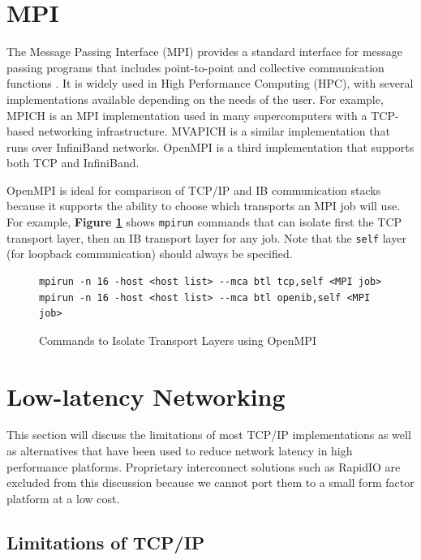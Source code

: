 \documentclass[11pt]{book}
\begin{document}
\section{\textbf{MPI}}

The Message Passing Interface (MPI) provides a standard interface for message
passing programs that includes point-to-point and collective communication
functions \cite{mpi-12}. It is widely used in High Performance Computing (HPC), with several
implementations available depending on the needs of the user. For example, MPICH
\cite{mpich} is an MPI implementation used in many supercomputers with a
TCP-based networking infrastructure. MVAPICH \cite{mvapich} is a similar
implementation that runs over InfiniBand networks. OpenMPI \cite{openmpi} is a
third implementation that supports both TCP and InfiniBand.

OpenMPI is ideal for comparison of TCP/IP and IB communication stacks because it
supports the ability to choose which transports an MPI job will use. For
example, \textbf{Figure \ref{ompi-btl}} shows \verb;mpirun; commands that can
isolate first the TCP transport layer, then an IB transport layer for any
job. Note that the \verb;self; layer (for loopback communication) should always
be specified.

\begin{figure}
\centering
\begin{verbatim}
mpirun -n 16 -host <host list> --mca btl tcp,self <MPI job>
mpirun -n 16 -host <host list> --mca btl openib,self <MPI job>
\end{verbatim}
\caption{Commands to Isolate Transport Layers using OpenMPI}
\label{ompi-btl}
\end{figure}

\section{\textbf{Low-latency Networking}}

This section will discuss the limitations of most TCP/IP implementations as well
as alternatives that have been used to reduce network latency in high
performance platforms. Proprietary interconnect solutions such as
RapidIO are excluded from this discussion because we cannot port them to a
small form factor platform at a low cost.

\subsection{\textbf{Limitations of TCP/IP}}
\end{document}
